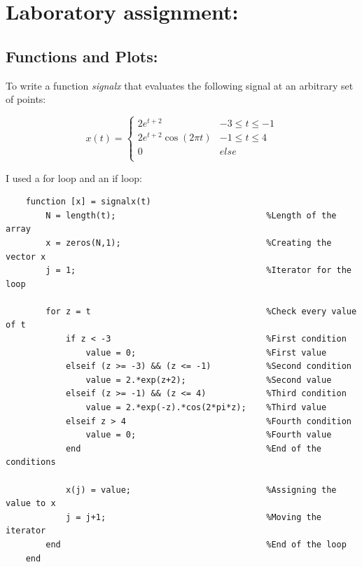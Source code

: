 \documentclass[a4paper,11pt]{article}
\begin{document}
\section{Laboratory assignment:}

\subsection{Functions and Plots:}

To write a function \textit{signalx} that evaluates the following signal at an arbitrary set of points:

\bigskip

\begin{equation}\label{eq:ex1}
    x(t) =
    \begin{cases}
      2e^{t+2} & -3 \leq t \leq -1 \\
      2e^{t+2}\cos(2\pi t) & -1 \leq t \leq 4 \\
      0 & else\\
    \end{cases}
\end{equation}

\bigskip

I used a for loop and an if loop:

\bigskip

\begin{lstlisting}
    function [x] = signalx(t)
        N = length(t);                              %Length of the array
        x = zeros(N,1);                             %Creating the vector x
        j = 1;                                      %Iterator for the loop

        for z = t                                   %Check every value of t
            if z < -3                               %First condition
                value = 0;                          %First value
            elseif (z >= -3) && (z <= -1)           %Second condition
                value = 2.*exp(z+2);                %Second value
            elseif (z >= -1) && (z <= 4)            %Third condition
                value = 2.*exp(-z).*cos(2*pi*z);    %Third value
            elseif z > 4                            %Fourth condition
                value = 0;                          %Fourth value
            end                                     %End of the conditions

            x(j) = value;                           %Assigning the value to x
            j = j+1;                                %Moving the iterator
        end                                         %End of the loop
    end
\end{lstlisting}
\end{document}

